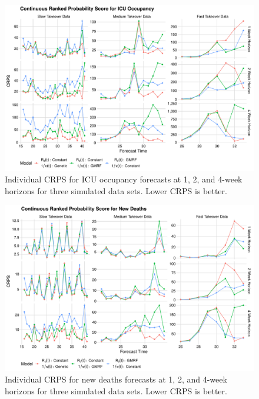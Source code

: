 \begin{figure}
    \centering
    \includegraphics[width=1.0\columnwidth]{simulated_crps_comparison_data_icu_plot}
    \caption{Individual CRPS for ICU occupancy forecasts at 1, 2, and 4-week horizons for three simulated data sets. Lower CRPS is better.}
    \label{ch_5:fig:simulated_crps_comparison_data_icu_plot}
\end{figure}

\begin{figure}
    \centering
    \includegraphics[width=1.0\columnwidth]{simulated_crps_comparison_data_new_deaths_plot}
    \caption{Individual CRPS for new deaths forecasts at 1, 2, and 4-week horizons for three simulated data sets. Lower CRPS is better.}
    \label{ch_5:fig:simulated_crps_comparison_data_new_deaths_plot}
\end{figure}

